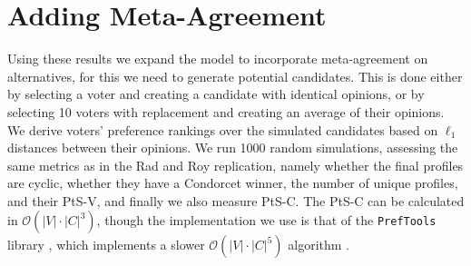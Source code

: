 \section{Adding Meta-Agreement}

Using these results we expand the model to
incorporate meta-agreement on alternatives, for this we need to generate
potential candidates. This is done either by selecting a voter and creating a
candidate with identical opinions, or by selecting 10 voters with replacement
and creating an average of their opinions. We derive voters’ preference
rankings over the simulated candidates based on $\ell_1$ distances between
their opinions. We run 1000 random simulations, assessing the same metrics as in the Rad and Roy replication,
namely whether the final profiles are cyclic, whether they have a Condorcet
winner, the number of unique profiles, and their PtS-V, and finally we also
measure PtS-C. The PtS-C can be calculated in $\mathcal{O}(|V| \cdot{} |C|
	^3)$\cite{przedmojskiAlgorithmsExperimentsNearly}, though the implementation we
use is that of the \texttt{PrefTools} library \cite{PrefLibPreflibtools2025},
which implements a slower $\mathcal{O}(|V| \cdot{} |C|^5)$ algorithm
\cite{erdelyiComputationalAspectsNearly2013}.


